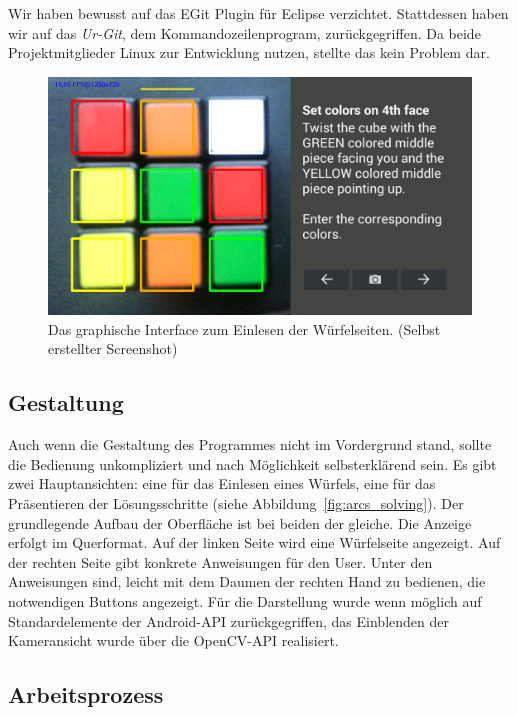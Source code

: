 Wir haben bewusst auf das EGit Plugin für Eclipse verzichtet. Stattdessen haben
wir auf das \emph{Ur-Git}, dem Kommandozeilenprogram, zurückgegriffen. Da beide
Projektmitglieder Linux zur Entwicklung nutzen, stellte das kein Problem dar.

\begin{figure}[ht!]
  \centering
  \includegraphics[width=\textwidth]{pics/arcs_unsolved.png}
  \caption{Das graphische Interface zum Einlesen der Würfelseiten.
  (Selbst erstellter Screenshot)}
  \label{fig:arcs_unsolved}
\end{figure}


\subsection{Gestaltung}  %

Auch wenn die Gestaltung des Programmes nicht im Vordergrund stand, sollte die
Bedienung unkompliziert und nach Möglichkeit selbsterklärend sein. Es gibt zwei
Hauptansichten: eine für das Einlesen eines Würfels, eine für das Präsentieren
der Lösungsschritte (siehe Abbildung~\ref{fig:arcs_solving}). Der grundlegende
Aufbau der Oberfläche ist bei beiden der gleiche. Die Anzeige erfolgt im
Querformat. Auf der linken Seite wird eine Würfelseite angezeigt. Auf der
rechten Seite gibt konkrete Anweisungen für den User. Unter den Anweisungen
sind, leicht mit dem Daumen der rechten Hand zu bedienen, die notwendigen
Buttons angezeigt. Für die Darstellung wurde wenn möglich auf Standardelemente
der Android-API zurückgegriffen, das Einblenden der Kameransicht wurde über die
OpenCV-API realisiert.

\subsection{Arbeitsprozess}  %

